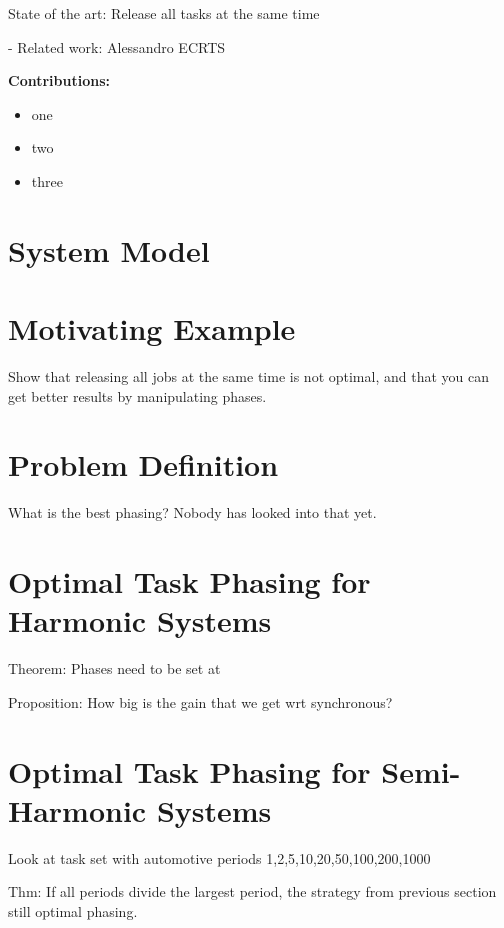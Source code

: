 \documentclass[conference]{resources/IEEEtran}
\theoremstyle{definition}
\theoremstyle{remark}
\begin{document}
	


	State of the art: Release all tasks at the same time


	- Related work: Alessandro ECRTS
	
	
	\noindent\textbf{Contributions:} %
	\begin{itemize}
		\item one
		\item two
		\item three
	\end{itemize}
	
\section{System Model}
\label{sec:system_model}

\section{Motivating Example}

	Show that releasing all jobs at the same time is not optimal, and that you can get better results by manipulating phases.
	
\section{Problem Definition}
\label{sec:problem_def}

	What is the best phasing? Nobody has looked into that yet. 

\section{Optimal Task Phasing for Harmonic Systems}

	Theorem: Phases need to be set at 


	Proposition: How big is the gain that we get wrt synchronous?



\section{Optimal Task Phasing for Semi-Harmonic Systems}

	Look at task set with automotive periods 1,2,5,10,20,50,100,200,1000


	Thm: If all periods divide the largest period, the strategy from previous section still optimal phasing.
\end{document}
